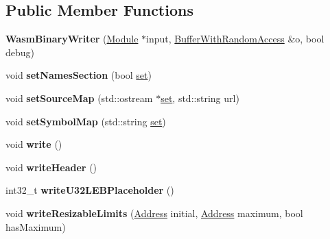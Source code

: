 \subsection*{Public Member Functions}
\begin{DoxyCompactItemize}
\item 
\mbox{\label{classwasm_1_1_wasm_binary_writer_a1e0807ca40395ed9fb22389c9c454c48}} 
{\bfseries Wasm\+Binary\+Writer} (\mbox{\hyperlink{classwasm_1_1_module}{Module}} $\ast$input, \mbox{\hyperlink{classwasm_1_1_buffer_with_random_access}{Buffer\+With\+Random\+Access}} \&o, bool debug)
\item 
\mbox{\label{classwasm_1_1_wasm_binary_writer_aff11a7a929e6c88da05c79110cbeb68d}} 
void {\bfseries set\+Names\+Section} (bool \mbox{\hyperlink{classstd_1_1set}{set}})
\item 
\mbox{\label{classwasm_1_1_wasm_binary_writer_a5498def7c6b4f442faca13d0df848b5b}} 
void {\bfseries set\+Source\+Map} (std\+::ostream $\ast$\mbox{\hyperlink{classstd_1_1set}{set}}, std\+::string url)
\item 
\mbox{\label{classwasm_1_1_wasm_binary_writer_af81539253414ed7b20cb456ba2b15ed0}} 
void {\bfseries set\+Symbol\+Map} (std\+::string \mbox{\hyperlink{classstd_1_1set}{set}})
\item 
\mbox{\label{classwasm_1_1_wasm_binary_writer_ad3cff8c20ec4a053d1ab0b3213dd38f3}} 
void {\bfseries write} ()
\item 
\mbox{\label{classwasm_1_1_wasm_binary_writer_a478bdb2b1cc2e13e0e070260d6a0bd34}} 
void {\bfseries write\+Header} ()
\item 
\mbox{\label{classwasm_1_1_wasm_binary_writer_ac236d3c2fb004454bb2936a2dc2198a7}} 
int32\+\_\+t {\bfseries write\+U32\+L\+E\+B\+Placeholder} ()
\item 
\mbox{\label{classwasm_1_1_wasm_binary_writer_a45cf3fdcd14b029fec680c7ee5b79ab2}} 
void {\bfseries write\+Resizable\+Limits} (\mbox{\hyperlink{structwasm_1_1_address}{Address}} initial, \mbox{\hyperlink{structwasm_1_1_address}{Address}} maximum, bool has\+Maximum)

\end{DoxyCompactItemize}
